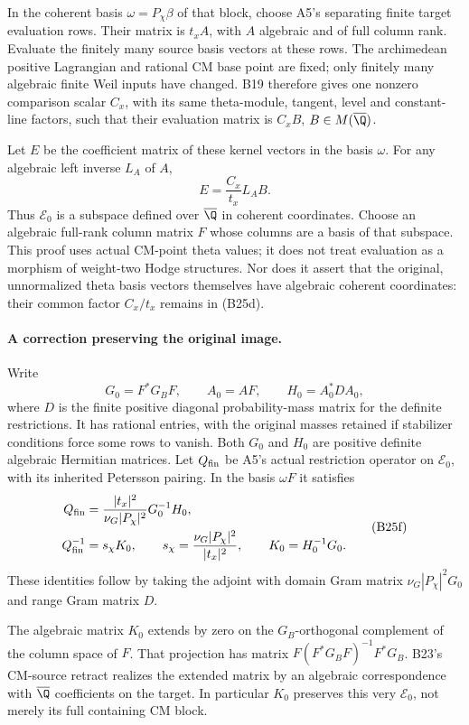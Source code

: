 In the coherent basis $\omega=P_\chi\beta$ of
that block, choose A5's separating finite
target evaluation rows.  Their matrix is
$t_xA$, with $A$ algebraic and of full column
rank.  Evaluate the finitely many source
basis vectors at these rows.  The archimedean
positive Lagrangian and rational CM base point
are fixed; only finitely many algebraic finite
Weil inputs have changed.  B19 therefore gives
one nonzero comparison scalar $C_x$, with its
same theta-module, tangent, level and constant-line
factors, such that their evaluation matrix is
$C_xB$, $B\in M(\overline\Q)$.

Let $E$ be the coefficient matrix of these
kernel vectors in the basis $\omega$.  For
any algebraic left inverse $L_A$ of $A$,
\[
       E=\frac{C_x}{t_x}L_AB.
 \tag{B25d}
\]
Thus $\mathcal E_0$ is a subspace defined over
$\overline\Q$ in coherent coordinates.  Choose
an algebraic full-rank column matrix $F$ whose
columns are a basis of that subspace.
This proof uses actual CM-point theta values;
it does not treat evaluation as a morphism of
weight-two Hodge structures.  Nor does it
assert that the original, unnormalized theta
basis vectors themselves have algebraic
coherent coordinates: their common factor
$C_x/t_x$ remains in (B25d).

\paragraph{A correction preserving the original image.}
Write
\[
 G_0=F^*G_BF,\qquad A_0=AF,\qquad
 H_0=A_0^*DA_0,
 \tag{B25e}
\]
where $D$ is the finite positive diagonal
probability-mass matrix for the definite
restrictions.  It has rational entries, with
the original masses retained if stabilizer
conditions force some rows to vanish.
Both $G_0$ and $H_0$ are positive definite
algebraic Hermitian matrices.
Let $Q_{\rm fin}$ be A5's actual restriction
operator on $\mathcal E_0$, with its
inherited Petersson pairing.  In the basis
$\omega F$ it satisfies
\[
 \begin{split}
 Q_{\rm fin}&=
  \frac{|t_x|^2}{\nu_G|P_\chi|^2}G_0^{-1}H_0,\\
 Q_{\rm fin}^{-1}&=s_\chi K_0,
 \qquad s_\chi=\frac{\nu_G|P_\chi|^2}{|t_x|^2},
 \qquad K_0=H_0^{-1}G_0.
 \end{split}
 \tag{B25f}
\]
These identities follow by taking the adjoint
with domain Gram matrix $\nu_G|P_\chi|^2G_0$
and range Gram matrix $D$.

The algebraic matrix $K_0$ extends by zero
on the $G_B$-orthogonal complement of the
column space of $F$.  That projection has
matrix $F(F^*G_BF)^{-1}F^*G_B$.
B23's CM-source retract realizes the extended
matrix by an algebraic correspondence with
$\overline\Q$ coefficients on the target.
In particular $K_0$ preserves this very
$\mathcal E_0$, not merely its full containing
CM block.

